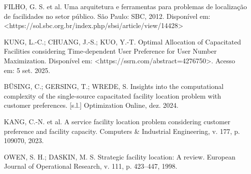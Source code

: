 \documentclass[12pt]{article}
\begin{document}
\begin{thebibliography}{99}

 FILHO, G. S. et al. Uma arquitetura e ferramentas para problemas de localização de facilidades no setor público. São Paulo: SBC, 2012. Disponível em: <https://sol.sbc.org.br/index.php/sbsi/article/view/14428>

 KUNG, L.-C.; CHUANG, J.-S.; KUO, Y.-T. Optimal Allocation of Capacitated Facilities considering Time-dependent User Preference for User Number Maximization. Disponível em: <https://ssrn.com/abstract=4276750>. Acesso em: 5 set. 2025. 

 BÜSING, C.; GERSING, T.; WREDE, S. Insights into the computational complexity of the single-source capacitated facility location problem with customer preferences. [s.l.] Optimization Online, dez. 2024. 

 KANG, C.-N. et al. A service facility location problem considering customer preference and facility capacity. Computers \& Industrial Engineering, v. 177, p. 109070, 2023.

 OWEN, S. H.; DASKIN, M. S. Strategic facility location: A review. European Journal of Operational Research, v. 111, p. 423–447, 1998. 

\end{thebibliography}
\end{document}
